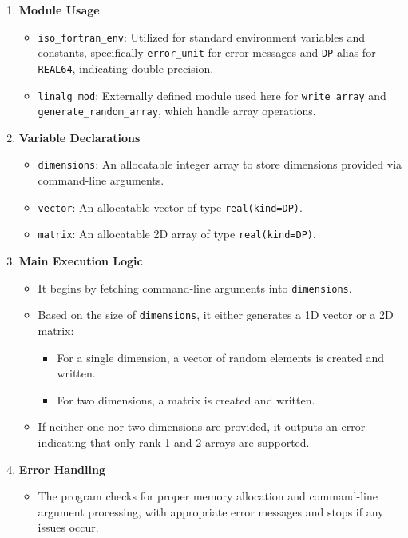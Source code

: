\begin{enumerate}
\item \textbf{Module Usage}

\begin{itemize}
\item \texttt{iso\_fortran\_env}: Utilized for standard environment variables and constants, specifically \texttt{error\_unit} for error messages and \texttt{DP} alias for \texttt{REAL64}, indicating double precision.
\item \texttt{linalg\_mod}: Externally defined module used here for \texttt{write\_array} and \texttt{generate\_random\_array}, which handle array operations.
\end{itemize}


\item \textbf{Variable Declarations}

\begin{itemize}
\item \texttt{dimensions}: An allocatable integer array to store dimensions provided via command-line arguments.
\item \texttt{vector}: An allocatable vector of type \texttt{real(kind=DP)}.
\item \texttt{matrix}: An allocatable 2D array of type \texttt{real(kind=DP)}.
\end{itemize}


\item \textbf{Main Execution Logic}

\begin{itemize}
\item It begins by fetching command-line arguments into \texttt{dimensions}.
\item Based on the size of \texttt{dimensions}, it either generates a 1D vector or a 2D matrix:

\begin{itemize}
\item For a single dimension, a vector of random elements is created and written.
\item For two dimensions, a matrix is created and written.
\end{itemize}


\item If neither one nor two dimensions are provided, it outputs an error indicating that only rank 1 and 2 arrays are supported.
\end{itemize}


\item \textbf{Error Handling}

\begin{itemize}
\item The program checks for proper memory allocation and command-line argument processing, with appropriate error messages and stops if any issues occur.
\end{itemize}
\end{enumerate}

